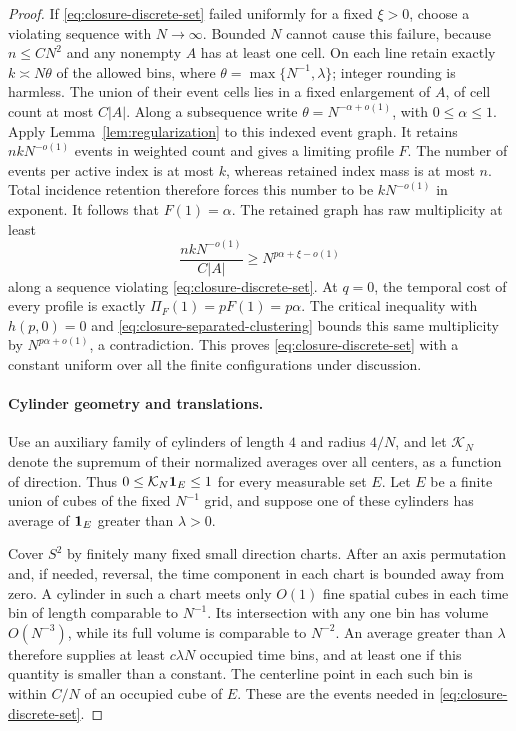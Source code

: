 \begin{proof}
If \eqref{eq:closure-discrete-set} failed uniformly for a fixed
\(\xi>0\), choose a violating sequence with \(N\to\infty\).  Bounded
\(N\) cannot cause this failure, because \(n\le CN^2\) and any
nonempty \(A\) has at least one cell.  On each line retain exactly
\(k\asymp N\theta\) of the allowed bins, where
\(\theta=\max\{N^{-1},\lambda\}\); integer rounding is harmless.
The union of their event cells lies in a fixed enlargement of \(A\),
of cell count at most \(C|A|\).  Along a subsequence write
\(\theta=N^{-\alpha+o(1)}\), with \(0\le\alpha\le1\).
Apply Lemma~\ref{lem:regularization} to this indexed event graph.  It
retains \(nkN^{-o(1)}\) events in weighted count and gives a limiting
profile \(F\).  The number of events per active index is at most \(k\),
whereas retained index mass is at most \(n\).  Total incidence retention
therefore forces this number to be \(kN^{-o(1)}\) in exponent.  It
follows that \(F(1)=\alpha\).  The retained graph has raw multiplicity
at least
\[
  \frac{nkN^{-o(1)}}{C|A|}
      \ge N^{p\alpha+\xi-o(1)}
\]
along a sequence violating \eqref{eq:closure-discrete-set}.
At \(q=0\), the temporal cost of every profile is exactly
\(\Pi_F(1)=pF(1)=p\alpha\).  The critical inequality with
\(h(p,0)=0\) and \eqref{eq:closure-separated-clustering} bounds this
same multiplicity by \(N^{p\alpha+o(1)}\), a contradiction.  This
proves \eqref{eq:closure-discrete-set} with a constant uniform over
all the finite configurations under discussion.

\paragraph{Cylinder geometry and translations.}
Use an auxiliary family of cylinders of length \(4\) and radius
\(4/N\), and let \(\mathcal K_N\) denote the supremum of their
normalized averages over all centers, as a function of direction.
Thus \(0\le\mathcal K_N\mathbf 1_E\le1\) for every measurable set \(E\).
Let \(E\) be a finite union of cubes of the fixed \(N^{-1}\) grid,
and suppose one of these cylinders has average of \(\mathbf 1_E\) greater
than \(\lambda>0\).

Cover \(S^2\) by finitely many fixed small direction charts.  After an
axis permutation and, if needed, reversal, the time component in each
chart is bounded away from zero.  A cylinder in such a chart meets only
\(O(1)\) fine spatial cubes in each time bin of length comparable to
\(N^{-1}\).  Its intersection with any one bin has volume
\(O(N^{-3})\), while its full volume is comparable to \(N^{-2}\).
An average greater than \(\lambda\) therefore supplies at least
\(c\lambda N\) occupied time bins, and at least one if this quantity
is smaller than a constant.  The centerline point in each such bin is
within \(C/N\) of an occupied cube of \(E\).  These are the events
needed in \eqref{eq:closure-discrete-set}.


\end{proof}
